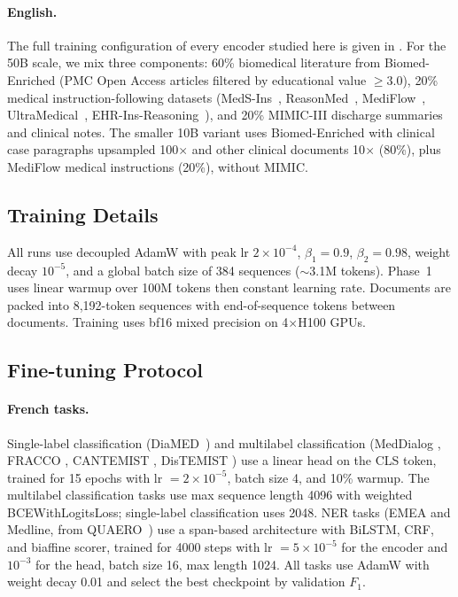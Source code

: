 \paragraph{English.} The full training configuration of every encoder studied here is given in . For the 50B scale, we mix three components: 60\% biomedical literature from Biomed-Enriched (PMC Open Access articles filtered by educational value $\geq 3.0$), 20\% medical instruction-following datasets (MedS-Ins~\citep{wu2025medsins}, ReasonMed~\citep{sun2025reasonmed}, MediFlow~\citep{corbeil2025mediflow}, UltraMedical~\citep{zhang2024ultramedical}, EHR-Ins-Reasoning~\citep{liao2025ehrr1}), and 20\% MIMIC-III discharge summaries and clinical notes. The smaller 10B variant uses Biomed-Enriched with clinical case paragraphs upsampled 100$\times$ and other clinical documents 10$\times$ (80\%), plus MediFlow medical instructions (20\%), without MIMIC.

\subsection{Training Details}

\begin{reviewread}
All runs use decoupled AdamW with peak lr $2 \times 10^{-4}$, $\beta_1 = 0.9$, $\beta_2 = 0.98$, weight decay $10^{-5}$, and a global batch size of 384 sequences ($\sim$3.1M tokens). Phase~1 uses linear warmup over 100M tokens then constant learning rate. Documents are packed into 8,192-token sequences with end-of-sequence tokens between documents. Training uses bf16 mixed precision on 4$\times$H100 GPUs.
\end{reviewread}

\subsection{Fine-tuning Protocol}

\paragraph{French tasks.} Single-label classification (DiaMED~\citep{drbenchmark2024}) and multilabel classification (MedDialog \citep{liu2024meddialog}, FRACCO \citep{pignat2024fracco}, CANTEMIST \citep{miranda2020cantemist}, DisTEMIST \citep{miranda2022distemist}) use a linear head on the CLS token, trained for 15 epochs with lr $= 2 \times 10^{-5}$, batch size 4, and 10\% warmup. The multilabel classification tasks use max sequence length 4096 with weighted BCEWithLogitsLoss; single-label classification uses 2048. NER tasks (EMEA and Medline, from QUAERO~\citep{neveol14quaero}) use a span-based architecture with BiLSTM, CRF, and biaffine scorer, trained for 4000 steps with lr $= 5 \times 10^{-5}$ for the encoder and $10^{-3}$ for the head, batch size 16, max length 1024. All tasks use AdamW with weight decay 0.01 and select the best checkpoint by validation $F_1$.

